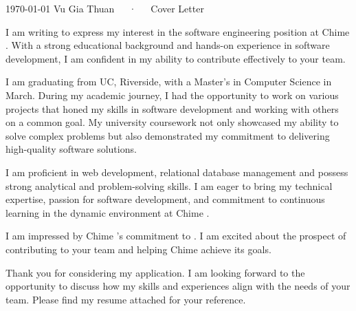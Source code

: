 \documentclass[11pt, a4paper]{derwent-cv}
\def\companyname{Chime }
\def\companystatement{}
\begin{document}
\makedercvheader[C]

\makecvfooter
  {\today}
  {Vu Gia Thuan~~~·~~~Cover Letter}
  {}

\makelettertitle

\begin{cvletter}
  I am writing to express my interest in the software engineering position at \companyname. With a strong educational background and hands-on experience in software development, I am confident in my ability to contribute effectively to your team.

I am graduating from UC, Riverside, with a Master's in Computer Science in March. During my academic journey, I had the opportunity to work on various projects that honed my skills in software development and working with others on a common goal. My university coursework not only showcased my ability to solve complex problems but also demonstrated my commitment to delivering high-quality software solutions.

  I am proficient in web development, relational database management and possess strong analytical and problem-solving skills. I am eager to bring my technical expertise, passion for software development, and commitment to continuous learning in the dynamic environment at \companyname.

I am impressed by \companyname's commitment to \companystatement. I am excited about the prospect of contributing to your team and helping \companyname  achieve its goals.

Thank you for considering my application. I am looking forward to the opportunity to discuss how my skills and experiences align with the needs of your team. Please find my resume attached for your reference.

\end{cvletter}
\makederletterclosing
\end{document}
